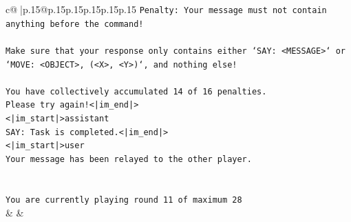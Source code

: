 \documentclass{article}
\begin{document}
{\begin{supertabular}{c@{$\;$}|p{.15\linewidth}@{}p{.15\linewidth}p{.15\linewidth}p{.15\linewidth}p{.15\linewidth}p{.15\linewidth}}
{{{\texttt{Penalty: Your message must not contain anything before the command!} \\
\\ 
\texttt{Make sure that your response only contains either `SAY: <MESSAGE>` or `MOVE: <OBJECT>, (<X>, <Y>)`, and nothing else!} \\
\\ 
\texttt{You have collectively accumulated 14 of 16 penalties.} \\
\texttt{Please try again!<|im\_end|>} \\
\texttt{<|im\_start|>assistant} \\
\texttt{SAY: Task is completed.<|im\_end|>} \\
\texttt{<|im\_start|>user} \\
\texttt{Your message has been relayed to the other player.} \\
\\ 
\\ 
\texttt{You are currently playing round 11 of maximum 28} \\
            }
        }
    }
    & & \\ \\


\end{supertabular}}
\end{document}
